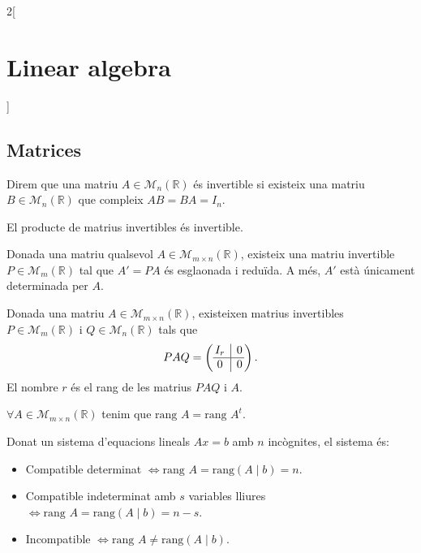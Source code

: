 \documentclass[class=article,10pt,crop=false]{standalone}
\begin{document}
\begin{multicols}{2}[\section{Linear algebra}]
\subsection{Matrices}
\begin{definition}
Direm que una matriu $A\in\mathcal{M}_n(\mathbb{R})$ és invertible si existeix una matriu $B\in\mathcal{M}_n(\mathbb{R})$ que compleix $AB=BA=I_n$.
\end{definition}
\begin{lemma}
El producte de matrius invertibles és invertible.
\end{lemma}
\begin{theorem}
Donada una matriu qualsevol $A\in\mathcal{M}_{m\times n}(\mathbb{R})$, existeix una matriu invertible $P\in\mathcal{M}_m(\mathbb{R})$ tal que $A'=PA$ és esglaonada i reduïda. A més, $A'$ està únicament determinada per $A$.
\end{theorem}
\begin{theorem}
Donada una matriu $A\in\mathcal{M}_{m\times n}(\mathbb{R})$, existeixen matrius invertibles $P\in\mathcal{M}_m(\mathbb{R})$ i $Q\in\mathcal{M}_n(\mathbb{R})$ tals que $$PAQ=\left(\begin{array}{@{\,} c|c @{\,}}
    I_r & 0\\
    \hline
    0 & 0
    \end{array}\right).$$ El nombre $r$ és el rang de les matrius $PAQ$ i $A$.
\end{theorem}
\begin{prop}
$\forall A\in\mathcal{M}_{m\times n}(\mathbb{R})$ tenim que $\text{rang }A=\text{rang }A^t$.
\end{prop}
\begin{theorem}
Donat un sistema d'equacions lineals $Ax=b$ amb $n$ incògnites, el sistema és:
\begin{itemize}
    \item Compatible determinat $\iff\text{rang }A=\text{rang}(A\mid b)=n$.
    \item Compatible indeterminat amb $s$ variables lliures $\iff\text{rang }A=\text{rang}(A\mid b)=n-s$.
    \item Incompatible $\iff\text{rang }A\ne\text{rang}(A\mid b)$.
\end{itemize}

\end{theorem}
\end{multicols}
\end{document}
